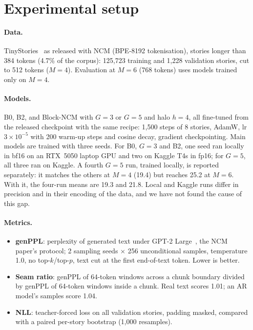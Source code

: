 \documentclass[10pt,twocolumn]{article}
\begin{document}
\section{Experimental setup}
\label{sec:setup}

\paragraph{Data.} TinyStories~\cite{tinystories} as released with NCM (BPE-8192 tokenisation), stories longer than
384 tokens (4.7\% of the corpus):
125,723 training and 1,228 validation stories, cut to 512 tokens ($M{=}4$). Evaluation at $M{=}6$ (768 tokens)
uses models trained only on $M{=}4$.

\paragraph{Models.} B0, B2, and Block-NCM with $G{=}3$ or $G{=}5$ and halo $h{=}4$, all fine-tuned from the
released checkpoint with the same recipe: 1,500 steps of 8 stories, AdamW, lr $3{\times}10^{-5}$ with 200 warm-up
steps and cosine decay, gradient checkpointing. Main models are trained with three seeds. For B0, $G{=}3$ and B2,
one seed ran locally in bf16 on an RTX~5050 laptop GPU and two on Kaggle T4s in fp16; for $G{=}5$, all three ran
on Kaggle. A fourth $G{=}5$ run, trained locally, is reported separately: it matches the others at $M{=}4$ (19.4)
but reaches 25.2 at $M{=}6$. With it, the four-run means are 19.3 and 21.8. Local and Kaggle runs differ in
precision and in their encoding of the data, and we have not found the cause of this gap.

\paragraph{Metrics.}
\begin{itemize}
  \item \textbf{genPPL}: perplexity of generated text under GPT-2 Large~\cite{gpt2}, the NCM paper's protocol;
        2 sampling seeds $\times$ 256 unconditional samples, temperature 1.0, no top-$k$/top-$p$, text cut at the
        first end-of-text token. Lower is better.
  \item \textbf{Seam ratio}: genPPL of 64-token windows across a chunk boundary divided by genPPL of 64-token
        windows inside a chunk. Real text scores 1.01; an AR model's samples score 1.04.
  \item \textbf{NLL}: teacher-forced loss on all validation stories, padding masked, compared with a paired
        per-story bootstrap (1,000 resamples).
\end{itemize}
\end{document}
